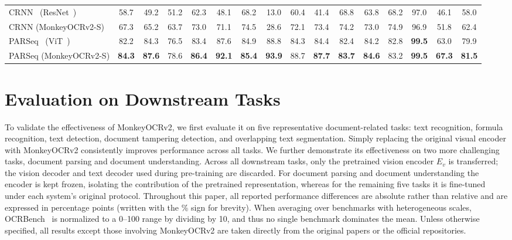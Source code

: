 \documentclass{article}
\begin{document}
\begin{table}[t]
{\begin{tabular}{l cccccccc c ccccc c}
\midrule

CRNN~\cite{crnn} (ResNet~\cite{resnet})
& 58.7
& 49.2 & 51.2 & 62.3 & 48.1 & 68.2 & 13.0 & 60.4 & 41.4
& 68.8 & 63.8 & 68.2 & 97.0 & 46.1
& 58.0
\\

CRNN (MonkeyOCRv2-S)
& 67.3
& 65.2 & 63.7 & 73.0 & 71.1 & 74.5 & 28.6 & 72.1 & 73.4
& 74.2 & 73.0 & 74.9 & 96.9 & 51.8
& 62.4
\\

\midrule

PARSeq~\cite{parseq} (ViT~\cite{vit})
& 82.2
& 84.3 & 76.5 & 83.4 & 87.6 & 84.9 & 88.8 & 84.3 & 84.4
& 82.4 & 84.2 & 82.8 & \textbf{99.5} & 63.0
& 79.9
\\

PARSeq (MonkeyOCRv2-S)
& \textbf{84.3}
& \textbf{87.6} & 78.6 & \textbf{86.4} & \textbf{92.1} & \textbf{85.4} & \textbf{93.9} & 88.7 & \textbf{87.7}
& \textbf{83.7} & \textbf{84.6} & 83.2 & \textbf{99.5} & \textbf{67.3}
& \textbf{81.5}
\\

\bottomrule
\end{tabular}
}
\end{table}




\section{Evaluation on Downstream Tasks}


To validate the effectiveness of MonkeyOCRv2, we first evaluate it on five representative document-related tasks: 
text recognition, formula recognition, text detection, document tampering detection, and overlapping text segmentation.
Simply replacing the original visual encoder with MonkeyOCRv2 consistently improves performance across all tasks. We further demonstrate its effectiveness on two more challenging tasks, document parsing and document understanding.
Across all downstream tasks, only the pretrained vision encoder $E_v$ is transferred; the vision decoder and text decoder used during pre-training are discarded. For document parsing and document understanding the encoder is kept frozen, isolating the contribution of the pretrained representation, whereas for the remaining five tasks it is fine-tuned under each system's original protocol.
Throughout this paper, all reported performance differences are absolute
rather than relative and are expressed in percentage points (written with
the \% sign for brevity). When averaging over benchmarks with heterogeneous scales, OCRBench~\cite{ocrbench} is normalized to a 0--100 range by dividing by 10, and thus no single benchmark dominates the mean. Unless otherwise specified, all results except those involving MonkeyOCRv2 are taken directly from the original papers or the official repositories.
\end{document}
